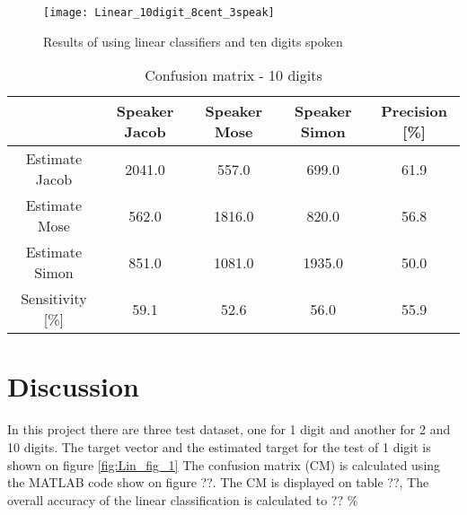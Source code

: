 \begin{figure}[H]
\centering
\texttt{[image: Linear\_10digit\_8cent\_3speak]}
\caption{Results of using linear classifiers and ten digits spoken}
\label{fig:Lin_fig_10}
\end{figure}
\begin{table}[H]                                                    
\centering                                                          
\begin{tabular}{|c|c|c|c|c|}                                        
\hline                                                              
  & Speaker Jacob & Speaker Mose & Speaker Simon & Precision [\%] \\
\hline                                                              
Estimate Jacob & 2041.0 & 557.0 & 699.0 & 61.9 \\                   
\hline                                                              
Estimate Mose & 562.0 & 1816.0 & 820.0 & 56.8 \\                    
\hline                                                              
Estimate Simon & 851.0 & 1081.0 & 1935.0 & 50.0 \\                  
\hline                                                              
Sensitivity [\%] & 59.1 & 52.6 & 56.0 & 55.9 \\                     
\hline                                                              
\end{tabular}                                                       
\caption{Confusion matrix - 10 digits}                              
\label{table:Lin_conf_10}                                           
\end{table}                                                         


\section{Discussion}
In this project there are three test dataset, one for 1 digit and another for 2 and 10 digits.
The target vector and the estimated target for the test of 1 digit is shown on figure \ref{fig:Lin_fig_1}
The confusion matrix (CM) is calculated using the MATLAB code show on figure ??. 
The CM is displayed on table ??, The overall accuracy of the linear classification is  calculated to ?? \%
